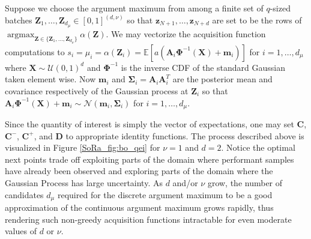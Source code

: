 \documentclass[graybox]{svmult}
\begin{document}
Suppose we choose the argument maximum  from among a finite set of $q$-sized batches $\boldsymbol{Z}_1,\dots,\boldsymbol{Z}_{d_\mu} \in [0,1]^{(d,\nu)}$ so that $\boldsymbol{z}_{N+1}, \dots,\boldsymbol{z}_{N+d}$ are set to be the rows of $\mathop{\text{argmax}}_{\boldsymbol{Z} \in \{\boldsymbol{Z}_1,\dots,\boldsymbol{Z}_{d_\mu}\}}\alpha(\boldsymbol{Z})$. We may vectorize the acquisition function computations to $s_i = \mu_i = \alpha(\boldsymbol{Z}_i) = \mathbb{E}\left[a\left(\boldsymbol{A}_i\boldsymbol{\Phi}^{-1}(\boldsymbol{X})+\boldsymbol{m}_i\right)\right]$ for $i=1,\dots,d_\mu$ where $\boldsymbol{X} \sim \mathcal{U}(0,1)^d$ and $\boldsymbol{\Phi}^{-1}$ is the inverse CDF of the standard Gaussian taken element wise. Now $\boldsymbol{m}_i$ and $\boldsymbol{\Sigma}_i = \boldsymbol{A}_i\boldsymbol{A}_i^T$ are the posterior mean and covariance respectively of the Gaussian process at $\boldsymbol{Z}_i$ so that $\boldsymbol{A}_i\boldsymbol{\Phi}^{-1}(\boldsymbol{X})+\boldsymbol{m}_i \sim \mathcal{N}\left(\boldsymbol{m}_i,\boldsymbol{\Sigma}_i\right)$ for $i=1,\dots,d_\mu$.

Since the quantity of interest is simply the vector of expectations, one may set $\boldsymbol{C}$, $\boldsymbol{C}^-$, $\boldsymbol{C}^+$, and $\boldsymbol{D}$ to appropriate identity functions. The process described above is visualized in Figure \ref{SoRa_fig:bo_qei} for $\nu=1$ and $d=2$. Notice the optimal next points trade off exploiting parts of the domain where performant samples have already been observed and  exploring parts of the domain where the Gaussian Process has large uncertainty.  As $d$ and/or $\nu$ grow, the number of candidates $d_\mu$ required for the discrete argument maximum to be a good approximation of the continuous argument maximum grows rapidly, thus rendering such non-greedy acquisition functions intractable for even moderate values of $d$ or $\nu$.
\end{document}

